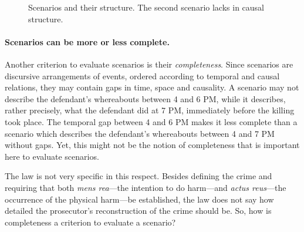 \documentclass[10pt]{article}
\begin{document}

\begin{figure}[bt]
\centering

\caption{Scenarios and their structure\label{fig:scens}. 
The second scenario lacks in causal structure.}
\end{figure}



\paragraph{Scenarios can be more or less complete.}

Another criterion to evaluate scenarios is their \textit{completeness}. Since scenarios are discursive arrangements of events, ordered according to 
temporal and causal relations, they may contain gaps in time, space and causality. A scenario may not describe the defendant's whereabouts between 4 and 6 PM, 
while it describes, rather precisely, what the defendant did at 7 PM, immediately before the killing took place. The temporal gap between 4 and 6 PM 
makes it less complete than a scenario which describes the defendant's whereabouts between 4 and 7 PM without gaps. 
Yet, this might not be the notion of completeness that is important here to evaluate scenarios. 


The law is not very specific in this respect. 
Besides defining the crime and requiring that both \textit{mens rea}---the
 intention to do harm---and \textit{actus reus}---the occurrence of the physical harm---be established, the law does 
 not say how detailed the prosecutor's reconstruction of the crime should be. 
So, how is completeness a criterion to evaluate a scenario? 
\end{document}
